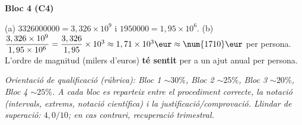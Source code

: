 \begin{solucions}
\noindent\textbf{Bloc 4 (C4)}
\begin{sollist}\setcounter{enumi}{4}
  \item (a) $\num{3326000000}=3,326\times 10^{9}$ i
        $\num{1950000}=1,95\times 10^{6}$. \quad
        (b) $\dfrac{3,326\times 10^{9}}{1,95\times 10^{6}}=\dfrac{3,326}{1,95}\times 10^{3}
        \approx 1,71\times 10^{3}\eur\approx\num{1710}\eur$ per persona. L'ordre de
        magnitud (milers d'euros) \textbf{té sentit} per a un ajut anual per persona.
\end{sollist}

\end{solucions}

\noindent\small\textit{Orientació de qualificació (rúbrica): Bloc 1 $\sim 30\%$,
Bloc 2 $\sim 25\%$, Bloc 3 $\sim 20\%$, Bloc 4 $\sim 25\%$. A cada bloc es reparteix
entre el procediment correcte, la notació (intervals, extrems, notació científica) i
la justificació/comprovació. Llindar de superació: $4,0/10$; en cas contrari,
recuperació trimestral.}
